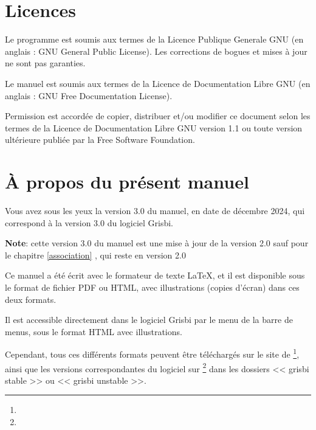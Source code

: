 \section{Licences\label{introduction-licenses}}


Le programme est soumis aux termes de la \gls{Licence Publique Generale GNU}
(en anglais : \gls{GNU General Public License}). Les corrections de bogues et mises à jour ne sont pas garanties.

Le manuel est soumis aux termes de la \gls{Licence de Documentation Libre GNU} (en anglais : \gls{GNU Free Documentation License}).

Permission est accordée de copier, distribuer et/ou modifier ce document
selon les termes de la Licence de Documentation Libre GNU version 1.1 ou toute version ultérieure publiée par la \gls{Free Software Foundation}.


\section{À propos du présent manuel\label{introduction-manual}}


Vous avez sous les yeux la version \actuality{}3.0 du manuel, en date de \actuality{}décembre 2024, qui correspond à la version 3.0 du logiciel Grisbi.


\textbf{Note}: cette version 3.0 du manuel est une mise à jour de la version 2.0 sauf pour le chapitre \vref{association} , qui reste en version 2.0 %


Ce manuel a été écrit avec le \gls{formateur de texte} \gls{LaTeX}, et il est disponible sous le \gls{format de fichier} \gls{PDF} ou \gls{HTML}, avec illustrations (copies d'écran) dans ces deux formats. 

Il est accessible directement dans le logiciel Grisbi par le menu  de la barre de menus, sous le format \gls{HTML} avec illustrations.

Cependant, tous ces différents formats peuvent être téléchargés sur le site de \footnote{\urlSourceForgeDocumentation{}}, ainsi que les versions correspondantes du logiciel sur \footnote{\urlSourceForge{}} dans les dossiers << \textsf{grisbi stable} >> ou << \textsf{grisbi unstable} >>.

